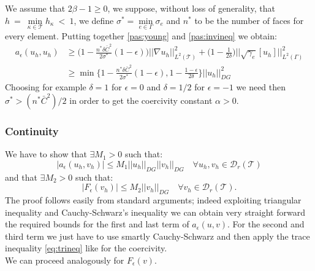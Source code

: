 \documentclass[12pt, a4paper]{article}
\theoremstyle{definition}
\theoremstyle{plain}
\theoremstyle{plain}
\theoremstyle{definition}
\begin{document}
We assume that $2\beta - 1 \geq 0$, we suppose, without loss of generality, 
that 
$h~=~\min\limits_{\kappa \in \mathcal{T}} h_\kappa~<~1$, we define $\sigma^* = 
\min\limits_{e \in \Gamma} \sigma_e$ and $n^*$ to be the number of faces for 
every element. Putting together \eqref{pas:young} and \eqref{pas:invineq} we 
obtain:
\begin{equation*}
\begin{split}
a_\epsilon(u_h, u_h) &\geq \big(1 - \frac{n^*\delta\bar{C}^2}{2\sigma^*} (1-\epsilon)\big) \big|\!\big| \nabla u_h \big|\!\big|^2_{L^2(\mathcal{T})}
+ \big(1 - \frac{1}{2\delta} \big) \bigg|\!\bigg| \sqrt{\gamma_e} [u_h] \bigg|\!\bigg|^2_{L^2(\Gamma)}\\
&\geq \min\bigg\{1 - \frac{n^*\delta\bar{C}^2}{2\sigma^*} (1-\epsilon) , 1 - \frac{1-\epsilon}{2\delta}\bigg\} |\!|u_h|\!|^2_{DG}
\end{split}
\end{equation*}
Choosing for example $\delta = 1$ for $\epsilon = 0$ and  $\delta = 1/2$ for 
$\epsilon = -1 $ we need then $\sigma^* > (n^*\bar{C}^2)/2$ in order to get the 
coercivity constant $\alpha > 0$.
\subsubsection{Continuity}
We have to show that $\exists M_1 > 0$ such that:
\begin{equation*}
	|a_\epsilon(u_h, v_h)| \leq M_1 |\!|u_h|\!|_{DG} |\!|v_h|\!|_{DG} \quad 
	\forall u_h, v_h \in \mathcal{D}_r(\mathcal{T})
\end{equation*}
and that $\exists M_2 > 0$ such that:
\begin{equation*}
	|F_\epsilon(v_h)| \leq M_2 |\!|v_h|\!|_{DG} \quad \forall v_h \in 
	\mathcal{D}_r(\mathcal{T}).
\end{equation*}
The proof follows easily from standard arguments; indeed exploiting triangular inequality and Cauchy-Schwarz's inequality we can obtain very straight forward the required bounds for the first and last term of $a_\epsilon(u, v)$. For the second and third term we just have to use smartly Cauchy-Schwarz and then apply the trace inequality \eqref{eq:trineq} like for the coercivity.\\
We can proceed analogously for $F_\epsilon(v)$.
\newpage
\end{document}
